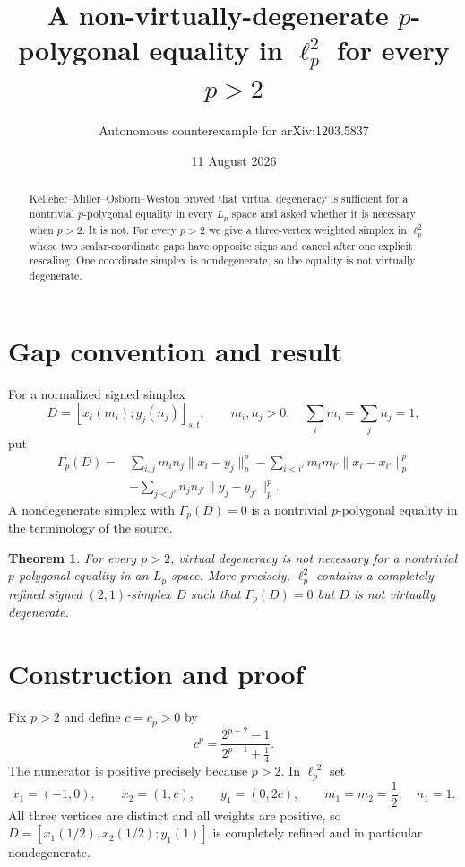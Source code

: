 \documentclass[11pt]{article}
\title{A non-virtually-degenerate $p$-polygonal equality in $\ell_p^2$ for every $p>2$}
\author{Autonomous counterexample for arXiv:1203.5837}
\date{11 August 2026}
\newtheorem{theorem}{Theorem}
\newcommand{\ellp}{\ell_p^{,2}}
\newcommand{\gap}{\Gamma_p}
\begin{document}
\maketitle

\begin{abstract}
Kelleher--Miller--Osborn--Weston proved that virtual degeneracy is sufficient
for a nontrivial $p$-polygonal equality in every $L_p$ space and asked whether
it is necessary when $p>2$.  It is not.  For every $p>2$ we give a
three-vertex weighted simplex in $\ell_p^2$ whose two scalar-coordinate gaps
have opposite signs and cancel after one explicit rescaling.  One coordinate
simplex is nondegenerate, so the equality is not virtually degenerate.
\end{abstract}

\section{Gap convention and result}

For a normalized signed simplex
\[
 D=[x_i(m_i);y_j(n_j)]_{s,t},\qquad
 m_i,n_j>0,\quad \sum_i m_i=\sum_j n_j=1,
\]
put
\begin{align*}
 \gap(D)={}&\sum_{i,j}m_in_j\|x_i-y_j\|_p^p
 -\sum_{i<i'}m_im_{i'}\|x_i-x_{i'}\|_p^p\\
 &-\sum_{j<j'}n_jn_{j'}\|y_j-y_{j'}\|_p^p.
\end{align*}
A nondegenerate simplex with $\gap(D)=0$ is a nontrivial
$p$-polygonal equality in the terminology of the source.

\begin{theorem}\label{thm:main}
For every $p>2$, virtual degeneracy is not necessary for a nontrivial
$p$-polygonal equality in an $L_p$ space.  More precisely, $\ell_p^2$ contains
a completely refined signed $(2,1)$-simplex $D$ such that $\gap(D)=0$ but $D$
is not virtually degenerate.
\end{theorem}

\section{Construction and proof}

Fix $p>2$ and define $c=c_p>0$ by
\begin{equation}\label{eq:c}
 c^p=\frac{2^{p-2}-1}{2^{p-1}+\tfrac14}.
\end{equation}
The numerator is positive precisely because $p>2$.  In $\ellp$ set
\begin{equation}\label{eq:vertices}
 x_1=(-1,0),\qquad x_2=(1,c),\qquad y_1=(0,2c),
 \qquad m_1=m_2=\frac12,\quad n_1=1.
\end{equation}
All three vertices are distinct and all weights are positive, so
$D=[x_1(1/2),x_2(1/2);y_1(1)]$ is completely refined and in particular
nondegenerate.
\end{document}
